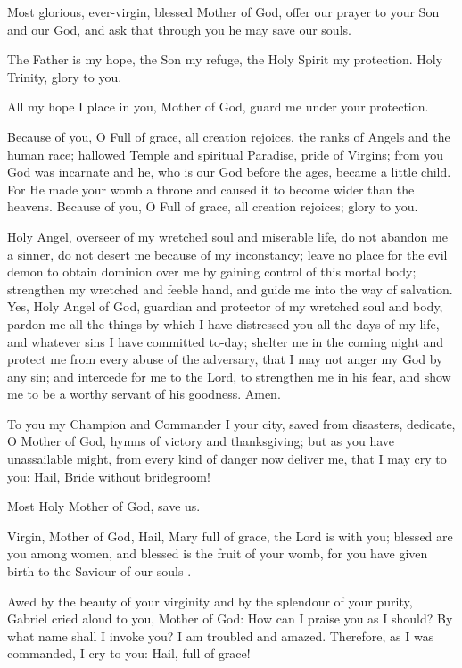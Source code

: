 
Most glorious, ever-virgin, blessed Mother of God, offer our prayer to your Son and our God,
and ask that through you he may save our souls.


The Father is my hope, the Son my refuge, the Holy Spirit my protection. Holy Trinity, glory to you.


All my hope I place in you, Mother of God, guard me under your protection.

Because of you, O Full of grace, all creation rejoices, the ranks of Angels and the human race;
hallowed Temple and spiritual Paradise, pride of Virgins;
from you God was incarnate and he, who is our God before the ages, became a little child.
For He made your womb a throne and caused it to become wider than the heavens.
Because of you, O Full of grace, all creation rejoices; glory to you.


Holy Angel, overseer of my wretched soul and miserable life, do not abandon me a sinner,
do not desert me because of my inconstancy;
leave no place for the evil demon to obtain dominion over me by gaining control of this mortal body;
strengthen my wretched and feeble hand, and guide me into the way of salvation.
Yes, Holy Angel of God, guardian and protector of my wretched soul and body,
pardon me all the things by which I have distressed you all the days of my life,
and whatever sins I have committed to-day; 
shelter me in the coming night and protect me from every abuse of the adversary,
that I may not anger my God by any sin; and intercede for me to the Lord,
to strengthen me in his fear, and show me to be a worthy servant of his goodness. Amen.


To you my Champion and Commander I your city, saved from disasters, dedicate,
O Mother of God, hymns of victory and thanksgiving; but as you have unassailable might,
from every kind of danger now deliver me, that I may cry to you: Hail, Bride without bridegroom!

Most Holy Mother of God, save us.


Virgin, Mother of God, Hail, Mary full of grace, the Lord is with you;
blessed are you among women, and blessed is the fruit of your womb,
for you have given birth to the Saviour of our souls .


\glorybothnow



Awed by the beauty of your virginity and by the splendour of your purity,
Gabriel cried aloud to you, Mother of God: 
How can I praise you as I should? By what name shall I invoke you? I am troubled and amazed.
Therefore, as I was commanded, I cry to you: Hail, full of grace!\rest

\throughtheprayers

